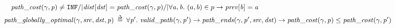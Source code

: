 \begin{figure}
\begin{equation*}
\begin{split}
&\m{path\_cost}(\gamma, \m{p}) \not= \texttt{INF} /| \m{dist}[\m{dst}] = \m{path\_cost}(\gamma, \m{p}) /| \forall \m{a, b}.~\m(a,b) \in p -> \m{prev}[\m{b}] = \m{a} \\
\vspace{1em}
&\!\!\!\!\!\!\m{path\_globally\_optimal}(\gamma, \m{src}, \m{dst}, \m{p}) \; \defeq \; 
\forall \m{p'}.~\m{valid\_path}(\gamma, \m{p'}) -> \m{path\_ends}(\gamma, \m{p'}, \m{src}, \m{dst}) -> \m{path\_cost}(\gamma, \m{p}) \le \m{path\_cost}(\gamma, \m{p'})
\end{split}  
\end{equation*}
\end{figure}

